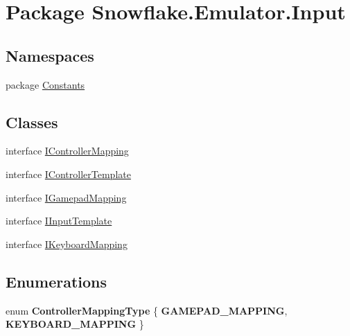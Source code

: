 \hypertarget{namespace_snowflake_1_1_emulator_1_1_input}{}\section{Package Snowflake.\+Emulator.\+Input}
\label{namespace_snowflake_1_1_emulator_1_1_input}
\subsection*{Namespaces}
\begin{DoxyCompactItemize}
\item 
package \hyperlink{namespace_snowflake_1_1_emulator_1_1_input_1_1_constants}{Constants}
\end{DoxyCompactItemize}
\subsection*{Classes}
\begin{DoxyCompactItemize}
\item 
interface \hyperlink{interface_snowflake_1_1_emulator_1_1_input_1_1_i_controller_mapping}{I\+Controller\+Mapping}
\item 
interface \hyperlink{interface_snowflake_1_1_emulator_1_1_input_1_1_i_controller_template}{I\+Controller\+Template}
\item 
interface \hyperlink{interface_snowflake_1_1_emulator_1_1_input_1_1_i_gamepad_mapping}{I\+Gamepad\+Mapping}
\item 
interface \hyperlink{interface_snowflake_1_1_emulator_1_1_input_1_1_i_input_template}{I\+Input\+Template}
\item 
interface \hyperlink{interface_snowflake_1_1_emulator_1_1_input_1_1_i_keyboard_mapping}{I\+Keyboard\+Mapping}
\end{DoxyCompactItemize}
\subsection*{Enumerations}
\begin{DoxyCompactItemize}
\item 
\hypertarget{namespace_snowflake_1_1_emulator_1_1_input_a11c378a2c1b47408ab41ad3d005d30db}{}enum {\bfseries Controller\+Mapping\+Type} \{ {\bfseries G\+A\+M\+E\+P\+A\+D\+\_\+\+M\+A\+P\+P\+I\+N\+G}, 
{\bfseries K\+E\+Y\+B\+O\+A\+R\+D\+\_\+\+M\+A\+P\+P\+I\+N\+G}
 \}\label{namespace_snowflake_1_1_emulator_1_1_input_a11c378a2c1b47408ab41ad3d005d30db}

\end{DoxyCompactItemize}
